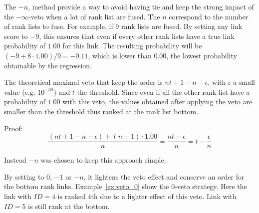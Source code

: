 The $-n$, method provide a way to avoid having tie and keep the strong impact of the $-\infty$-veto when a lot of rank list are fused.
The $n$ correspond to the number of rank lists to fuse.
For example, if $9$ rank lists are fused.
By setting any link score to $-9$, this ensures that even if every other rank lists have a true link probability of $1.00$ for this link.
The resulting probability will be $(-9 + 8 \cdot 1.00) / 9 = -0.11$, which is lower than $0.00$, the lowest probability obtainable by the regression.

The theoretical maximal veto that keep the order is $nt + 1 - n - \epsilon$, with $\epsilon$ a small value (e.g. $10^{-38}$) and $t$ the threshold.
Since even if all the other rank list have a probability of $1.00$ with this veto, the values obtained after applying the veto are smaller than the threshold thus ranked at the rank list bottom.

Proof:
$$\frac{(nt + 1 - n - \epsilon) + (n - 1) \cdot 1.00}{n} = \frac{nt - \epsilon}{n} = t - \frac{\epsilon}{n}$$

Instead $-n$ was chosen to keep this approach simple.

By setting to $0$, $-1$ or $-n$, it lightens the veto effect and conserve an order for the bottom rank links.
Example~\ref{ex:veto_0} show the $0$-veto strategy.
Here the link with $ID = 4$ is ranked $4$th due to a lighter effect of this veto.
Link with $ID = 5$ is still rank at the bottom.

